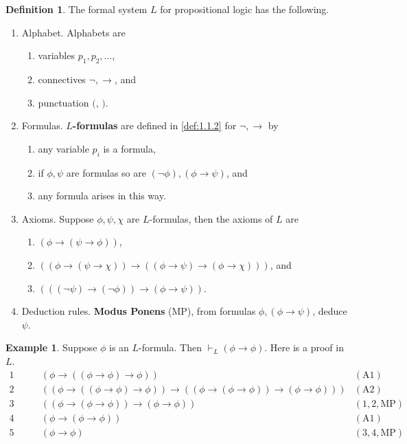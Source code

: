 \documentclass{article}
\newcommand{\rb}[1]{\left( #1 \right)}
\newcommand{\notb}[1]{\rb{\neg #1}}
\newcommand{\impb}[2]{\rb{#1 \rightarrow #2}}
\theoremstyle{definition}\newtheorem{definition}{Definition}[subsection]
\theoremstyle{definition}\newtheorem{remark}[definition]{Remark}
\theoremstyle{definition}\newtheorem*{example}{Example}
\theoremstyle{definition}\newtheorem*{note}{Note}
\begin{document}
\begin{definition}
\label{def:1.2.3}
The formal system \textbf{$ L $} for propositional logic has the following.
\begin{enumerate}
\item Alphabet. Alphabets are
\begin{enumerate}
\item variables $ p_1, p_2, \dots $,
\item connectives $ \neg, \rightarrow $, and
\item punctuation $ ( $, $ ) $.
\end{enumerate}
\item Formulas. \textbf{$ L $-formulas} are defined in \ref{def:1.1.2} for $ \neg, \rightarrow $ by
\begin{enumerate}
\item any variable $ p_i $ is a formula,
\item if $ \phi, \psi $ are formulas so are $ \notb{\phi}, \impb{\phi}{\psi} $, and
\item any formula arises in this way.
\end{enumerate}
\item Axioms. Suppose $ \phi, \psi, \chi $ are $ L $-formulas, then the axioms of $ L $ are
\begin{enumerate}[label=(A\arabic*)]
\item $ \impb{\phi}{\impb{\psi}{\phi}} $,
\item $ \impb{\impb{\phi}{\impb{\psi}{\chi}}}{\impb{\impb{\phi}{\psi}}{\impb{\phi}{\chi}}} $, and
\item $ \impb{\impb{\notb{\psi}}{\notb{\phi}}}{\impb{\phi}{\psi}} $.
\end{enumerate}
\item Deduction rules. \textbf{Modus Ponens} (MP), from formulas $ \phi, \impb{\phi}{\psi} $, deduce $ \psi $.
\end{enumerate}
\end{definition}

\begin{example}
Suppose $ \phi $ is an $ L $-formula. Then $ \vdash_L \impb{\phi}{\phi} $. Here is a proof in $ L $.
\begin{align*}
1 \qquad & \impb{\phi}{\impb{\impb{\phi}{\phi}}{\phi}} & \rb{\text{A1}} \\
2 \qquad & \impb{\impb{\phi}{\impb{\impb{\phi}{\phi}}{\phi}}}{\impb{\impb{\phi}{\impb{\phi}{\phi}}}{\impb{\phi}{\phi}}} & \rb{\text{A2}} \\
3 \qquad & \impb{\impb{\phi}{\impb{\phi}{\phi}}}{\impb{\phi}{\phi}} & \rb{1, 2, \text{MP}} \\
4 \qquad & \impb{\phi}{\impb{\phi}{\phi}} & \rb{\text{A1}} \\
5 \qquad & \impb{\phi}{\phi} & \rb{3, 4, \text{MP}}
\end{align*}
\end{example}
\end{document}
